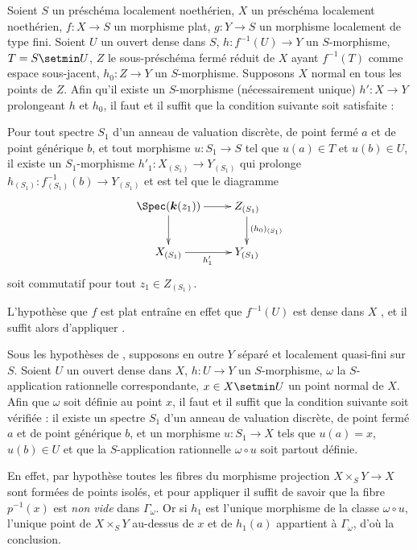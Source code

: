 \begin{corollary}[20.4.9]
\label{IV.20.4.9}
Soient $S$ un préschéma localement noethérien, $X$ un préschéma localement noethérien, $f:X\to S$ un morphisme plat, $g:Y\to S$ un morphisme localement de type fini.
Soient $U$ un ouvert dense dans $S$, $h:f^{-1}(U)\to Y$ un $S$-morphisme, $T=S\setmin U$, $Z$ le sous-préschéma fermé réduit de $X$ ayant $f^{-1}(T)$ comme espace sous-jacent, $h_0:Z\to Y$ un $S$-morphisme.
Supposons $X$ \textup{normal} en tous les points de $Z$.
Afin qu'il existe un $S$-morphisme (nécessairement unique) $h':X\to Y$ prolongeant $h$ et $h_0$, il faut et il suffit que la condition suivante soit satisfaite :

Pour tout spectre $S_1$ d'un anneau de valuation discrète, de point fermé $a$ et de point générique $b$, et tout morphisme $u:S_1\to S$ tel que $u(a)\in T$ et $u(b)\in U$, il existe un $S_1$-morphisme $h'_1:X_{(S_1)}\to Y_{(S_1)}$ qui prolonge $h_{(S_1)}:f_{(S_1)}^{-1}(b)\to Y_{(S_1)}$ et est tel que le diagramme
\[
  \xymatrix{
  \Spec(\boldsymbol{k}(z_1)) \ar[r] \ar[d] & Z_{(S_1)} \ar[d]^{(h_0)_{(S_1)}} \\
  X_{(S_1)} \ar[r]_{h'_1} & Y_{(S_1)}
  }
\]
soit commutatif pour tout $z_1\in Z_{(S_1)}$.
\end{corollary}

L'hypothèse que $f$ est plat entraîne en effet que $f^{-1}(U)$ est dense dans $X$ , et il suffit alors d'appliquer .

\begin{corollary}[20.4.10]
\label{IV.20.4.10}
Sous les hypothèses de , supposons en outre $Y$ séparé et localement quasi-fini sur $S$.
Soient $U$ un ouvert dense dans $X$, $h:U\to Y$ un $S$-morphisme, $\omega$ la $S$-application rationnelle correspondante, $x\in X\setmin U$ un point \textup{normal} de $X$.
Afin que $\omega$ soit définie au point $x$, il faut et il suffit que la condition suivante soit vérifiée : il existe un spectre $S_1$ d'un anneau de valuation discrète, de point fermé $a$ et de point générique $b$, et un morphisme $u:S_1\to X$
tels que $u(a)=x$, $u(b)\in U$ et que la $S$-application rationnelle $\omega\circ u$ soit partout définie.
\end{corollary}

En effet, par hypothèse toutes les fibres du morphisme projection $X\times_S Y\to X$ sont formées de points isolés, et pour appliquer  il suffit de savoir que la fibre $p^{-1}(x)$ est \emph{non vide} dans $\Gamma_\omega$.
Or si $h_1$ est l'unique morphisme de la classe $\omega\circ u$, l'unique point de $X\times_S Y$ au-dessus de $x$ et de $h_1(a)$ appartient à $\Gamma_\omega$, d'où la conclusion.

